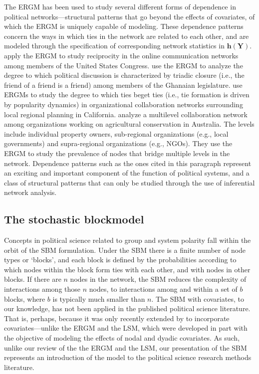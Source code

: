 \documentclass[fleqn,12pt]{wlscirep}
\newcommand{\bh}{\bm{h}}
\begin{document}
The ERGM has been used to study several different forms of dependence in political networks---structural patterns that go beyond the effects of covariates, of which the ERGM is uniquely capable of modeling. These dependence patterns concern the ways in which ties in the network are related to each other, and are modeled through the specification of corresponding network statistics in $ \bh(\bm{Y})$. \cite{peng2016follower} apply the ERGM to study reciprocity in the online communication networks among members of the United States Congress. \cite{osei2018party} use the ERGM to analyze the degree to which political discussion is characterized by triadic closure (i.e., the friend of a friend is a friend) among members of the Ghanaian legislature. \cite{gerber2013political} use ERGMs to study the degree to which ties beget ties (i.e., tie formation is driven by popularity dynamics) in organizational collaboration networks surrounding local regional planning in California. \cite{guerrero2015achieving} analyze a multilevel collaboration network among organizations working on agricultural conservation in Australia.  The levels include individual property owners, sub-regional organizations (e.g., local governments) and supra-regional organizations (e.g., NGOs). They use the ERGM to study the prevalence of nodes that bridge multiple levels in the network. Dependence patterns such as the ones cited in this paragraph represent an exciting and important component of the function of political systems, and a class of structural patterns that can only be studied through the use of inferential network analysis.


\subsection{The stochastic blockmodel}

Concepts in political science related to group  and system polarity \citep[e.g., ][]{baldassarri2007dynamics,cranmer2015kantian} fall within the orbit of the SBM formulation. Under the SBM there is a finite number of node types or `blocks', and each block is defined by the probabilities according to which nodes within the block form ties with each other, and with nodes in other blocks. If there are $n$ nodes in the network, the SBM reduces the complexity of interactions among those $n$ nodes, to interactions among and within a set of $b$ blocks, where $b$ is typically much smaller than $n$. The SBM with covariates, to our knowledge, has not been applied in the published political science literature. That is, perhaps, because it was only recently extended by \cite{sweet2015incorporating} to incorporate covariates---unlike the ERGM and the LSM, which were developed in part with the objective of modeling the effects of nodal and dyadic covariates. As such, unlike our review of the the ERGM and the LSM, our presentation of the SBM represents an introduction of the model to the political science research methods literature.
\end{document}
